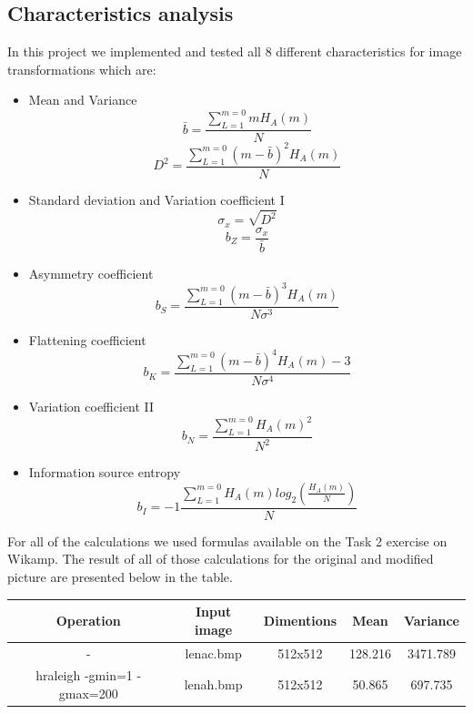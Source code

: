 \documentclass[12pt]{article}
\begin{document}
\subsection{Characteristics analysis}

In this project we implemented and tested all 8 different characteristics for image transformations which are:
\begin{itemize}
  \item Mean and Variance
  \[\bar{b} = \frac{\sum_{L=1}^{m=0}mH_A(m)}{N}\]
   \[  D^2 = \frac{\sum_{L=1}^{m=0}(m-\bar{b})^2H_A(m)}{N}\]
  \item Standard deviation and Variation coefficient I
   \[ \sigma _x=\sqrt{D^{2}}\]
    \[ b_Z= \frac{\sigma _x}{\bar{b}}\]
  \item Asymmetry coefficient
   \[b_S = \frac{\sum_{L=1}^{m=0}(m-\bar{b})^3H_A(m)}{N\sigma^3 }\]
  \item Flattening coefficient
   \[ b_K = \frac{\sum_{L=1}^{m=0}(m-\bar{b})^4H_A(m)-3}{N\sigma^4 }\]
  \item Variation coefficient II
   \[ b_N = \frac{\sum_{L=1}^{m=0}H_A(m)^2}{N^2}\]
  \item Information source entropy
   \[ b_I = -1\frac{\sum_{L=1}^{m=0}H_A(m)log_2(\frac{H_A(m)}{N})}{N}\]
\end{itemize}

For all of the calculations we used formulas available on the Task 2 exercise on Wikamp. The result of all of those calculations for the original and modified picture are presented below in the table. 

\begin{table}[H]\centering
    \begin{tabular}{ccccc}

        Operation 	
        & Input image 
        & Dimentions 
        &Mean 
        &Variance 
        \\\midrule
        -                         
        & lenac.bmp     
        & 512x512      
        &		128.216
        &3471.789
        \\
       hraleigh -gmin=1 -gmax=200         
       & lenah.bmp      
       & 512x512    
       &	50.865	
       &697.735
       \\

    \end{tabular}
\end{table}
\end{document}
